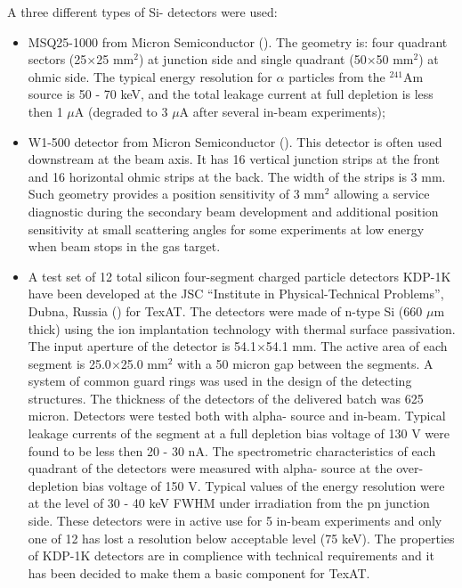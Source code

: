 \documentclass[final,number,sort&compress,5p,times,twocolumn]{elsarticle}
\begin{document}
A three different types of Si- detectors were used:
\begin{itemize}
  \item MSQ25-1000 from Micron Semiconductor (\cite{Micron}). The geometry is: four quadrant sectors (25$\times$25 mm$^2$) at junction side and single quadrant (50$\times$50 mm$^2$) at ohmic  side. The typical energy resolution for $\alpha$ particles from the $^{241}$Am source is 50 - 70 keV, and the total  leakage current at full depletion is less then 1 $\mu$A (degraded  to 3 $\mu$A after several in-beam experiments);  
  \item W1-500 detector from Micron Semiconductor (\cite{Micron}). This detector is often used downstream at the beam axis. It has 16  vertical junction strips at the front  and 16 horizontal  ohmic strips at the back. The width of the strips is 3 mm. Such geometry provides a position sensitivity of 3 mm$^2$ allowing  a service diagnostic during the secondary beam development and  additional position sensitivity at small scattering angles for some experiments at low energy when beam stops in the gas target.
\item A test set of 12 total silicon four-segment charged particle detectors  KDP-1K  have been developed at the JSC ``Institute in Physical-Technical Problems'', Dubna, Russia  (\cite{SiDetDubna}) for TexAT.  The detectors were made of n-type Si (660 $\mu$m thick) using the ion implantation technology with thermal surface passivation. The input aperture of the detector is 54.1$\times$54.1 mm. The active area of each segment is 25.0$\times$25.0 mm$^2$ with a 50 micron gap between the segments. A system of common guard rings was used in the design of the detecting structures. The thickness of the detectors of the delivered batch was 625 micron. Detectors were tested both with alpha- source and in-beam. Typical leakage currents of the segment at a full depletion bias voltage of 130 V were found to be less then 20 - 30 nA. The spectrometric characteristics of each quadrant of the detectors were measured with alpha-  source at the over-depletion bias voltage of 150 V. Typical values of the energy resolution were at the level of 30 - 40 keV FWHM under irradiation from the pn junction side.  These detectors were in active use for 5 in-beam experiments and only one of 12 has lost a resolution below acceptable level (75 keV).  The properties of  KDP-1K detectors are in complience with technical requirements and it has been decided  to make them a basic component for TexAT.
\end{itemize}
  
\end{document}
